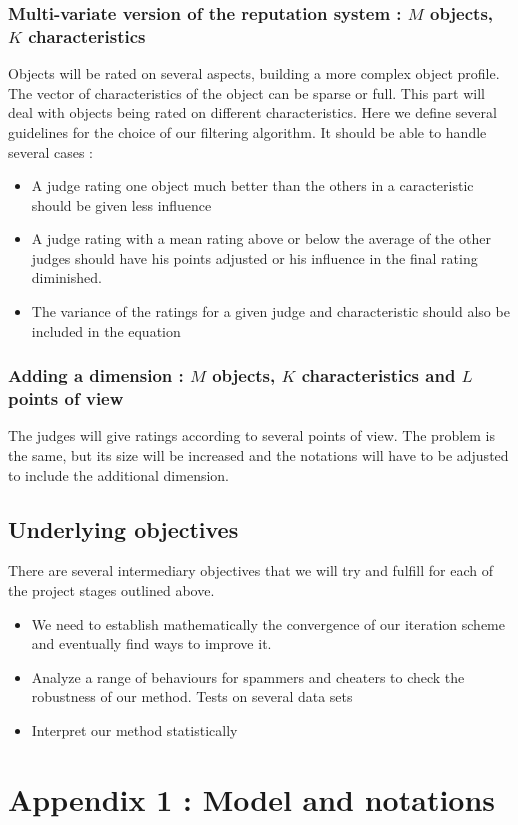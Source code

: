 \documentclass[12pt,a4paper,notitlepage]{article}
\begin{document}
\subsubsection*{Multi-variate version of the reputation system : $M$ objects, $K$ characteristics}
Objects will be rated on several aspects, building a more complex object profile. The vector of characteristics of the object can be sparse or full.
This part will deal with objects being rated on different characteristics. 
Here we define several guidelines for the choice of our filtering algorithm. It should be able to handle several cases :
\begin{itemize}
\item A judge rating one object much better than the others in a caracteristic should be given less influence
\item A judge rating with a mean rating above or below the average of the other judges should have his points adjusted or his influence in the final rating diminished.
\item The variance of the ratings for a given judge and characteristic should also be included in the equation
\end{itemize}

\subsubsection*{Adding a dimension : $M$ objects, $K$ characteristics and $L$ points of view}
The judges will give ratings according to several points of view. The problem is the same, but its size will be increased and the notations will have to be adjusted to include the additional dimension.
\subsection*{Underlying objectives}
There are several intermediary objectives that we will try and fulfill for each of the project stages outlined above.
\begin{itemize}
\item We need to establish mathematically the convergence of our iteration scheme and eventually find ways to improve it.
\item Analyze a range of behaviours for spammers and cheaters to check the robustness of our method. Tests on several data sets
\item Interpret our method statistically
\end{itemize}


\newpage
\section{Appendix 1 : Model and notations}




\nocite{*}
\end{document}
